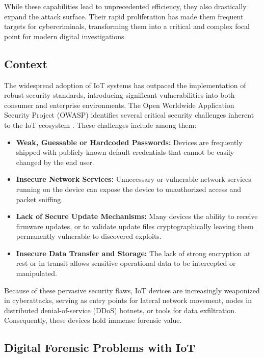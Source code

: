  While these capabilities lead to unprecedented efficiency, they also drastically expand the attack surface. Their rapid proliferation has made them frequent targets for cybercriminals, transforming them into a critical and complex focal point for modern digital investigations.

\subsection{Context}
The widespread adoption of IoT systems has outpaced the implementation of robust security standards, introducing significant vulnerabilities into both consumer and enterprise environments. The Open Worldwide Application Security Project (OWASP) identifies several critical security challenges inherent to the IoT ecosystem \cite{OWASPIoT2018}. These challenges include among them: 

\begin{itemize}
	\item \textbf{Weak, Guessable or Hardcoded Passwords:} Devices are frequently shipped with publicly known default credentials that cannot be easily changed by the end user.
	
	\item \textbf{Insecure Network Services:} Unnecessary or vulnerable network services running on the device can expose the device to unauthorized access and packet sniffing.
	
	\item \textbf{Lack of Secure Update Mechanisms:} Many devices the ability to receive firmware updates, or to validate update files cryptographically leaving them permanently vulnerable to discovered exploits. 
	
	\item \textbf{Insecure Data Transfer and Storage:} The lack of strong encryption at rest or in transit allows sensitive operational data to be intercepted or manipulated. 
\end{itemize}

Because of these pervasive security flaws, IoT devices are increasingly weaponized in cyberattacks, serving as entry points for lateral network movement, nodes in distributed denial-of-service (DDoS) botnets, or tools for data exfiltration. Consequently, these devices hold immense forensic value. 

\subsection{Digital Forensic Problems with IoT}

